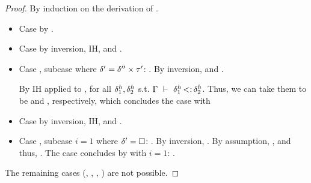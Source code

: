 \begin{proof}
    By induction on the derivation of
    .
    \begin{itemize}
        \item Case  by .
        \item Case  by inversion, IH, and .
        \item Case , subcase where
            $\delta' = \delta'' \times \tau'$:
                {}.
            By inversion,
             and
            . 
            
            By IH applied to 
            ,
                {\tyunion
                    {}
                    {}
                }
            for all $\delta^h_1, \delta^h_2$ s.t. $\Gamma\ \vdash\ \delta^h_1 \operatorname{<:} \delta^h_2$.
            Thus, we can take them to be  
            and , 
            respectively, which concludes the case with
                {\tyunion
                    {}
                    {}
                }
        \item Case  by inversion, IH, and .
        \item Case , subcase $i = 1$ where $\delta' = \square$:
            .
            By inversion, \subtydflt{}.
            By assumption, , and thus,
            .
            The case concludes by  with $i=1$:
                {}.
    \end{itemize}
    The remaining cases 
    (, , , ) 
    are not possible.
\end{proof}

